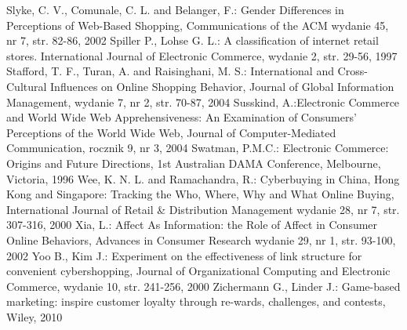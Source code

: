 {\begin{thebibliography}{5}
     Slyke, C. V., Comunale, C. L. and Belanger, F.: Gender Differences in Perceptions of Web-Based Shopping, Communications of the ACM wydanie 45, nr 7, str. 82-86, 2002
     Spiller P., Lohse G. L.: A classification of internet retail stores. International Journal of Electronic Commerce, wydanie 2, str. 29-56, 1997
     Stafford, T. F., Turan, A. and Raisinghani, M. S.: International and Cross-Cultural Influences on Online Shopping Behavior, Journal of Global Information Management, wydanie 7, nr 2, str. 70-87, 2004
     Susskind, A.:Electronic Commerce and World Wide Web Apprehensiveness: An Examination of Consumers' Perceptions of the World Wide Web, Journal of Computer-Mediated Communication, rocznik 9, nr 3, 2004
     Swatman, P.M.C.: Electronic Commerce: Origins and Future Directions, 1st
Australian DAMA Conference, Melbourne, Victoria, 1996
     Wee, K. N. L. and Ramachandra, R.: Cyberbuying in China, Hong Kong and Singapore: Tracking the Who, Where, Why and What Online Buying, International Journal of Retail \& Distribution Management wydanie 28, nr 7, str. 307-316, 2000
     Xia, L.: Affect As Information: the Role of Affect in Consumer Online Behaviors, Advances in Consumer Research wydanie 29, nr 1, str. 93-100, 2002
     Yoo B., Kim J.: Experiment on the effectiveness of link structure for convenient cybershopping, Journal of Organizational Computing and Electronic Commerce, wydanie 10, str. 241-256, 2000
     Zichermann G., Linder J.: Game-based marketing: inspire customer loyalty through re-wards, challenges, and contests, Wiley, 2010

  \end{thebibliography}
  \newpage
}

